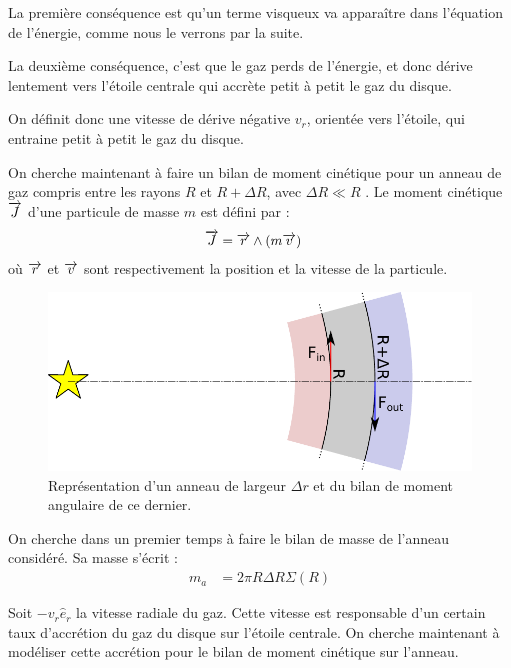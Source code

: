 \bigskip

La première conséquence est qu'un terme visqueux va apparaître dans l'équation de l'énergie, comme nous le verrons par la suite. 

La deuxième conséquence, c'est que le gaz perds de l'énergie, et donc dérive lentement vers l'étoile centrale qui accrète petit à petit le gaz du disque. 

On définit donc une vitesse de dérive négative $v_r$, orientée vers l'étoile, qui entraine petit à petit le gaz du disque.

\bigskip

On cherche maintenant à faire un bilan de moment cinétique pour un anneau de gaz compris entre les rayons $R$ et $R+\Delta R$, avec $\Delta R \ll R$ . Le moment cinétique ${\overrightarrow{J}}$ d'une particule de masse $m$ est défini par :
\begin{align}
{\overrightarrow{J}} &= {\overrightarrow{r}} \wedge (m{\overrightarrow{v}})
\end{align}
où ${\overrightarrow{r}}$ et ${\overrightarrow{v}}$ sont respectivement la position et la vitesse de la particule.

\bigskip

\begin{figure}[htb]
\centering
\includegraphics[width=0.7\linewidth]{figure/disk_ring.pdf}
\caption{Représentation d'un anneau de largeur $\Delta r$ et du bilan de moment angulaire de ce dernier.}\label{fig:disk_ring}
\end{figure}

On cherche dans un premier temps à faire le bilan de masse de l'anneau considéré. Sa masse s'écrit :
\begin{align}
m_a &= 2\pi R \Delta R \Sigma(R)\label{eq:m_a}
\end{align}

\bigskip

Soit $-v_r\hat{e}_r$ la vitesse radiale du gaz. Cette vitesse est responsable d'un certain taux d'accrétion du gaz du disque sur l'étoile centrale. On cherche maintenant à modéliser cette accrétion pour le bilan de moment cinétique sur l'anneau.


